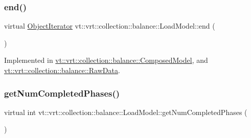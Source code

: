 \mbox{\label{classvt_1_1vrt_1_1collection_1_1balance_1_1_load_model_a8474fb097bddbd75711e1e8d74084651}} 
\subsubsection{\texorpdfstring{end()}{end()}}
{\footnotesize\ttfamily virtual \hyperlink{classvt_1_1vrt_1_1collection_1_1balance_1_1_object_iterator}{Object\+Iterator} vt\+::vrt\+::collection\+::balance\+::\+Load\+Model\+::end (\begin{DoxyParamCaption}{ }\end{DoxyParamCaption})\hspace{0.3cm}{\ttfamily [pure virtual]}}



Implemented in \hyperlink{classvt_1_1vrt_1_1collection_1_1balance_1_1_composed_model_a23ca95221c6bffb7417aafa2c939b40a}{vt\+::vrt\+::collection\+::balance\+::\+Composed\+Model}, and \hyperlink{structvt_1_1vrt_1_1collection_1_1balance_1_1_raw_data_a07ae6234d91c2daa7c2d51117b224f7d}{vt\+::vrt\+::collection\+::balance\+::\+Raw\+Data}.

\mbox{\label{classvt_1_1vrt_1_1collection_1_1balance_1_1_load_model_adb8e89bfd2fcb625326cf8a9446d8091}} 
\subsubsection{\texorpdfstring{get\+Num\+Completed\+Phases()}{getNumCompletedPhases()}}
{\footnotesize\ttfamily virtual int vt\+::vrt\+::collection\+::balance\+::\+Load\+Model\+::get\+Num\+Completed\+Phases (\begin{DoxyParamCaption}{ }\end{DoxyParamCaption})\hspace{0.3cm}{\ttfamily [pure virtual]}}



